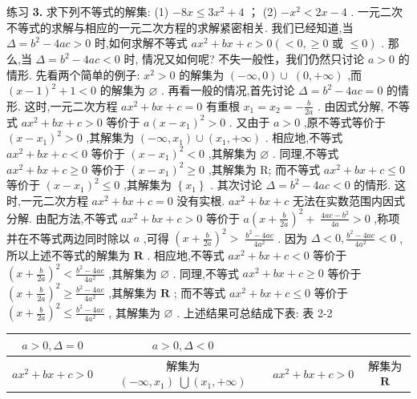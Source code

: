 \documentclass[a4paper,10pt,oneside,fontset=none]{ctexbook}
\renewcommand{\geq}{\geqslant}
\renewcommand{\leq}{\leqslant}
\newenvironment{exercise}[1][]{\begin{exBox}{练习}{#1}}{\end{exBox}}
\numberwithin{equation}{chapter}
\begin{document}
\begin{exercise}
\textbf{3.} 求下列不等式的解集: (1) $- {8x} \leq  {3{x}^{2}} + 4$ ； (2) $- {x}^{2} < {2x} - 4$ . 一元二次不等式的求解与相应的一元二次方程的求解紧密相关. 我们已经知道,当 $\Delta  = {b}^{2} - {4ac} > 0$ 时,如何求解不等式 $a{x}^{2} + {bx} + c > 0\left( { < 0, \geq  0\text{ 或 } \leq  0}\right)$ . 那么,当 $\Delta  = {b}^{2} - {4ac} < 0$ 时, 情况又如何呢? 不失一般性，我们仍然只讨论 $a > 0$ 的情形. 先看两个简单的例子: ${x}^{2} > 0$ 的解集为 $\left( {-\infty ,0}\right)  \cup \; \left( {0, + \infty }\right)$ ,而 ${\left( x - 1\right) }^{2} + 1 < 0$ 的解集为 $\varnothing$ . 再看一般的情况,首先讨论 $\Delta  = {b}^{2} - {4ac} = 0$ 的情形. 这时,一元二次方程 $a{x}^{2} + {bx} + c = 0$ 有重根 ${x}_{1} = {x}_{2} =  - \frac{b}{2a}$ . 由因式分解, 不等式 $a{x}^{2} + {bx} + c > 0$ 等价于 $a{\left( x - {x}_{1}\right) }^{2} > 0$ . 又由于 $a > 0$ ,原不等式等价于 ${\left( x - {x}_{1}\right) }^{2} > 0$ ,其解集为 $\left( {-\infty ,{x}_{1}}\right)  \cup  \left( {{x}_{1}, + \infty }\right)$ . 相应地,不等式 $a{x}^{2} + {bx} + c < 0$ 等价于 ${\left( x - {x}_{1}\right) }^{2} < 0$ ,其解集为 $\varnothing$ . 同理,不等式 $a{x}^{2} + {bx} + c \geq  0$ 等价于 ${\left( x - {x}_{1}\right) }^{2} \geq  0$ ,其解集为 R; 而不等式 $a{x}^{2} + {bx} + c \leq  0$ 等价于 ${\left( x - {x}_{1}\right) }^{2} \leq  0$ ,其解集为 $\left\{  {x}_{1}\right\}$ . 其次讨论 $\Delta  = {b}^{2} - {4ac} < 0$ 的情形. 这时,一元二次方程 $a{x}^{2} + {bx} + c = 0$ 没有实根. $a{x}^{2} + {bx} + c$ 无法在实数范围内因式分解. 由配方法,不等式 $a{x}^{2} + {bx} + c > 0$ 等价于 $a{\left( x + \frac{b}{2a}\right) }^{2} + \; \frac{{4ac} - {b}^{2}}{4a} > 0$ ,称项并在不等式两边同时除以 $a$ ,可得 ${\left( x + \frac{b}{2a}\right) }^{2} > \; \frac{{b}^{2} - {4ac}}{4{a}^{2}}$ . 因为 $\Delta  < 0,\frac{{b}^{2} - {4ac}}{4{a}^{2}} < 0$ ,所以上述不等式的解集为 $\mathbf{R}$ . 相应地,不等式 $a{x}^{2} + {bx} + c < 0$ 等价于 ${\left( x + \frac{b}{2a}\right) }^{2} < \frac{{b}^{2} - {4ac}}{4{a}^{2}}$ ,其解集为 $\varnothing$ . 同理,不等式 $a{x}^{2} + {bx} + c \geq  0$ 等价于 ${\left( x + \frac{b}{2a}\right) }^{2} \geq  \frac{{b}^{2} - {4ac}}{4{a}^{2}}$ ,其解集为 $\mathbf{R}$ ; 而不等式 $a{x}^{2} + {bx} + c \leq  0$ 等价于 ${\left( x + \frac{b}{2a}\right) }^{2} \leq  \frac{{b}^{2} - {4ac}}{4{a}^{2}}$ , 其解集为 $\varnothing$ . 上述结果可总结成下表: 表 2-2 \begin{center}
\begin{tabular}{|c|c|c|c|}
\hline
$a > 0,\Delta  = 0$ & $a > 0,\Delta  < 0$ \\\hline
$a{x}^{2} + {bx} + c > 0$ & 解集为 $\left( {-\infty ,{x}_{1}}\right) \; \bigcup \left( {{x}_{1}, + \infty }\right)$ & $a{x}^{2} + {bx} + c > 0$ & 解集为 $\mathbf{R}$ \\

\end{tabular}
\end{center}
\end{exercise}
\end{document}
